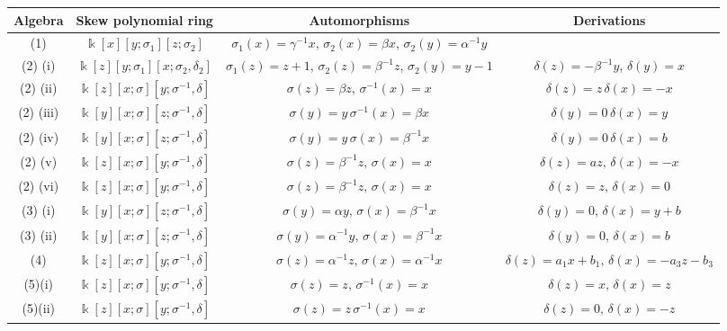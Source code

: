 \documentclass{amsart}
\theoremstyle{definition}
\theoremstyle{remark}
\numberwithin{equation}{section}
\begin{document}
\begin{landscape}
{\normalsize{
\begin{table}[h!]
\centering
\begin{tabular}{|c|c|c|c|}
\hline
{\bf Algebra} & {\bf Skew polynomial ring} & {\bf Automorphisms} & {\bf Derivations} \\ \hline
(1) & $\Bbbk[x][y;\sigma_1][z;\sigma_2]$ & $\sigma_1(x)=\gamma^{-1}x$, $\sigma_2(x)=\beta x$,  $\sigma_2(y)=\alpha^{-1}y$ & \\ \hline
(2) (i) & $\Bbbk[z][y;\sigma_1][x;\sigma_2,\delta_2]$ & $\sigma_1(z)=z+1$, $\sigma_2(z) = \beta^{-1}z$, $\sigma_2(y) = y-1$ & $\delta(z) = -\beta^{-1}y$, $\delta(y)=x$\\ \hline
(2) (ii) & $\Bbbk[z][x;\sigma][y;\sigma^{-1},\delta]$ & $\sigma(z) = \beta z, \, \sigma^{-1}(x) = x$ & $\delta(z) = z\, \delta(x) = -x$\\ \hline
(2) (iii) & $\Bbbk[y][x;\sigma][z;\sigma^{-1},\delta]$ & $\sigma(y) = y\, \sigma^{-1}(x) = \beta x$ & $\delta(y) = 0\, \delta(x) = y$ \\ \hline
(2) (iv) & $\Bbbk[y][x;\sigma][z;\sigma^{-1},\delta]$ & $\sigma(y) = y\, \sigma(x)=\beta^{-1}x$ & $\delta(y) = 0\, \delta(x) = b$ \\ \hline
(2) (v) & $\Bbbk[z][x;\sigma][y;\sigma^{-1},\delta]$ & $\sigma(z) = \beta^{-1}z, \, \sigma(x) = x$ & $\delta(z) = az, \, \delta(x) = -x$ \\ \hline
(2) (vi) & $\Bbbk[z][x;\sigma][y;\sigma^{-1},\delta]$ & $\sigma(z) = \beta^{-1}z, \, \sigma(x) = x$ & $\delta(z) = z, \, \delta(x) = 0$ \\ \hline
(3) (i) & $\Bbbk[y][x;\sigma][z;\sigma^{-1},\delta]$ & $\sigma(y)=\alpha y, \, \sigma(x)=\beta^{-1}x$  & $\delta(y) = 0, \, \delta(x) =  y+b$ \\ \hline
(3) (ii) & $\Bbbk[y][x;\sigma][z;\sigma^{-1},\delta]$ & $\sigma(y) = \alpha^{-1}y, \, \sigma(x) = \beta^{-1}x$ & $\delta(y) = 0, \, \delta(x) = b$\\ \hline
(4) & $\Bbbk[z][x;\sigma][y;\sigma^{-1},\delta]$ & $\sigma(z) = \alpha^{-1}z, \, \sigma(x) = \alpha^{-1}x$  & $\delta(z) = a_1x+b_1, \, \delta(x) = -a_3z-b_3$ \\ \hline
(5)(i)  & $\Bbbk[z][x;\sigma][y;\sigma^{-1},\delta]$ & $\sigma(z) = z, \, \sigma^{-1}(x) = x$ & $\delta(z) = x, \, \delta(x) = z$ \\ \hline
(5)(ii) & $\Bbbk[z][x;\sigma][y;\sigma^{-1},\delta]$ & $\sigma(z) = z\, \sigma^{-1}(x) = x$ & $\delta(z) = 0, \, \delta(x) = -z$ \\ \hline

\end{tabular}
\end{table}}}
\end{landscape}
\end{document}

